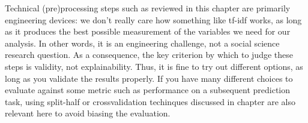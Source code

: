 Technical (pre)processing steps such as reviewed in this chapter are primarily engineering devices:
we don't really care how something like tf-idf works, as long as it produces the best possible measurement of the variables we need for our analysis.
In other words, it is an engineering challenge, not a social science research question.
As a consequence, the key criterion by which to judge these steps is validity, not explainability.
Thus, it is fine to try out different options, as long as you validate the results properly.
If you have many different choices to evaluate against some metric such as performance on a subsequent prediction task,
using split-half or crossvalidation techinques discussed in chapter  are also relevant here to avoid biasing the evaluation.
